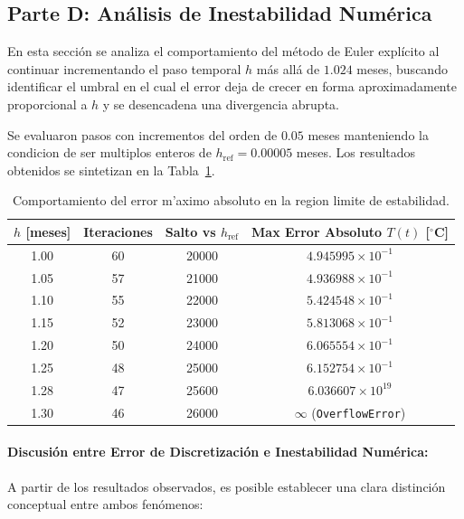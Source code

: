 \subsection{Parte D: Análisis de Inestabilidad Numérica}

En esta sección se analiza el comportamiento del método de Euler explícito al continuar incrementando el paso temporal $h$ más allá de $1.024$ meses, buscando identificar el umbral en el cual el error deja de crecer en forma aproximadamente proporcional a $h$ y se desencadena una divergencia abrupta.

Se evaluaron pasos con incrementos del orden de $0.05$ meses manteniendo la condicion de ser multiplos enteros de $h_{\text{ref}} = 0.00005$ meses. Los resultados obtenidos se sintetizan en la Tabla~\ref{tab:inestabilidad}.

\begin{table}[htbp]
    \centering
    \caption{Comportamiento del error m'aximo absoluto en la region limite de estabilidad.}
    \label{tab:inestabilidad}
    \begin{tabular}{|c|c|c|c|}
        \hline 
        $h$ [meses] & Iteraciones & Salto vs $h_{\text{ref}}$ & Max Error Absoluto $T(t)$ [$^\circ$C] \\ \hline
        1.00 & 60 & 20000 & $4.945995 \times 10^{-1}$ \\ \hline
        1.05 & 57 & 21000 & $4.936988 \times 10^{-1}$ \\ \hline
        1.10 & 55 & 22000 & $5.424548 \times 10^{-1}$ \\ \hline
        1.15 & 52 & 23000 & $5.813068 \times 10^{-1}$ \\ \hline
        1.20 & 50 & 24000 & $6.065554 \times 10^{-1}$ \\ \hline
        1.25 & 48 & 25000 & $6.152754 \times 10^{-1}$ \\ \hline
        1.28 & 47 & 25600 & $6.036607 \times 10^{19}$ \\ \hline
        1.30 & 46 & 26000 & $\infty$ (\texttt{OverflowError}) \\ \hline
    \end{tabular}
\end{table}

\paragraph{Discusión entre Error de Discretización e Inestabilidad Numérica:}
A partir de los resultados observados, es posible establecer una clara distinción conceptual entre ambos fenómenos:


